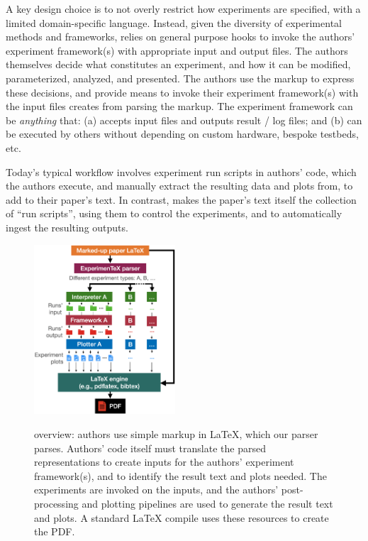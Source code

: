 \noindent A key design choice is to not overly restrict how experiments are specified, \eg with a limited domain-specific language. Instead, given the diversity of experimental methods and frameworks, \sysname relies on general purpose hooks to invoke the authors' experiment framework(s) with appropriate input and output files. The authors themselves decide what constitutes an experiment, and how it can be modified, parameterized, analyzed, and presented. The authors use the markup to express these decisions, and provide means to invoke their experiment framework(s) with the input files \sysname creates from parsing the markup. The experiment framework can be \emph{anything} that: (a) accepts input files and outputs result / log files; and (b) can be executed by others without depending on custom hardware, bespoke testbeds, etc.

Today's typical workflow involves experiment run scripts in authors' code, which the authors execute, and manually extract the resulting data and plots from, to add to their paper's text. In contrast, \sysname makes the paper's text itself the collection of ``run scripts'', using them to control the experiments, and to automatically ingest the resulting outputs.

\begin{figure}
 \begin{center}
  \includegraphics[width=0.47\textwidth]{figures/architecture.png}
  \caption{\sysname overview: authors use simple markup in \LaTeX{}, which our parser parses. Authors' code itself must translate the parsed representations to create inputs for the authors' experiment framework(s), and to identify the result text and plots needed. The experiments are invoked on the inputs, and the authors' post-processing and plotting pipelines are used to generate the result text and plots. A standard \LaTeX{} compile uses these resources to create the PDF.}
  \vspace{-5pt}
  \label{fig:architecture}
  \vspace{0pt}
 \end{center}
\end{figure}

